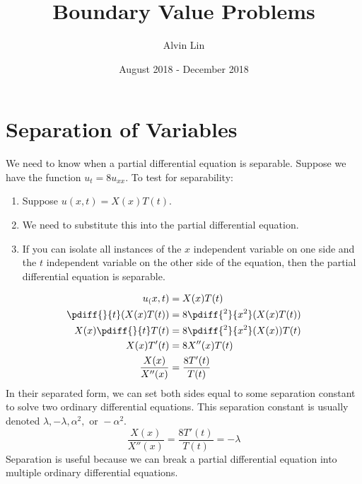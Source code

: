 \documentclass{math}
\title{Boundary Value Problems}
\author{Alvin Lin}
\date{August 2018 - December 2018}
\begin{document}
\maketitle

\section*{Separation of Variables}
We need to know when a partial differential equation is separable. Suppose we
have the function \( u_t = 8u_{xx} \). To test for separability:
\begin{enumerate}
  \item Suppose \( u(x,t) = X(x)T(t) \).
  \item We need to substitute this into the partial differential equation.
  \item If you can isolate all instances of the \( x \) independent variable
    on one side and the \( t \) independent variable on the other side of the
    equation, then the partial differential equation is separable.
\end{enumerate}
\begin{align*}
  u_(x,t) &= X(x)T(t) \\
  \pdiff{}{t}(X(x)T(t)) &= 8\pdiff{^2}{x^2}(X(x)T(t)) \\
  X(x)\pdiff{}{t}T(t) &= 8\pdiff{^2}{x^2}(X(x))T(t) \\
  X(x)T'(t) &= 8X''(x)T(t) \\
  \frac{X(x)}{X''(x)} &= \frac{8T'(t)}{T(t)}
\end{align*}
In their separated form, we can set both sides equal to some separation constant
to solve two ordinary differential equations. This separation constant is
usually denoted \( \lambda, -\lambda, \alpha^2, \text{ or } -\alpha^2 \).
\[ \frac{X(x)}{X''(x)} = \frac{8T'(t)}{T(t)} = -\lambda \]
Separation is useful because we can break a partial differential equation into
multiple ordinary differential equations.
\end{document}

